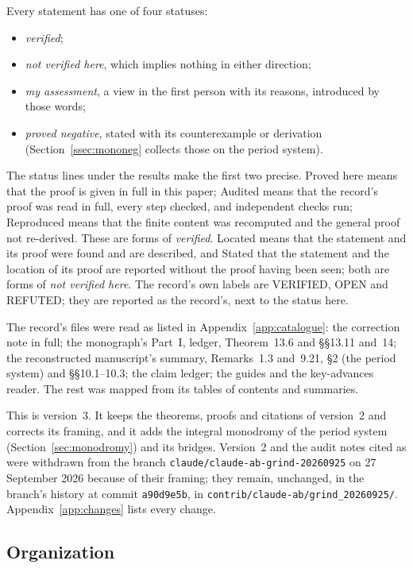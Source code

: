 Every statement has one of four statuses:
\begin{itemize}
\item \emph{verified};
\item \emph{not verified here}, which implies nothing in either direction;
\item \emph{my assessment}, a view in the first person with its reasons, introduced by those words;
\item \emph{proved negative}, stated with its counterexample or derivation (Section~\ref{ssec:mononeg} collects those on the period system).
\end{itemize}
The status lines under the results make the first two precise. \textsf{Proved here} means that the proof is given in full in this paper; \textsf{Audited} means that the record's proof was read in full, every step checked, and independent checks run; \textsf{Reproduced} means that the finite content was recomputed and the general proof not re-derived. These are forms of \emph{verified}. \textsf{Located} means that the statement and its proof were found and are described, and \textsf{Stated} that the statement and the location of its proof are reported without the proof having been seen; both are forms of \emph{not verified here}. The record's own labels are \textsf{VERIFIED}, \textsf{OPEN} and \textsf{REFUTED}; they are reported as the record's, next to the status here.

The record's files were read as listed in Appendix~\ref{app:catalogue}: the correction note in full; the monograph's Part~I, ledger, Theorem~13.6 and §§13.11 and~14; the reconstructed manuscript's summary, Remarks~1.3 and~9.21, §2 (the period system) and §§10.1--10.3; the claim ledger; the guides and the key-advances reader. The rest was mapped from its tables of contents and summaries.

This is version~3. It keeps the theorems, proofs and citations of version~2 and corrects its framing, and it adds the integral monodromy of the period system (Section~\ref{sec:monodromy}) and its bridges. Version~2 and the audit notes cited as  were withdrawn from the branch \texttt{claude/claude-ab-grind-20260925} on 27 September 2026 because of their framing; they remain, unchanged, in the branch's history at commit \texttt{a90d9e5b}, in \texttt{contrib/claude-ab/grind\_20260925/}. Appendix~\ref{app:changes} lists every change.

\subsection*{Organization}


